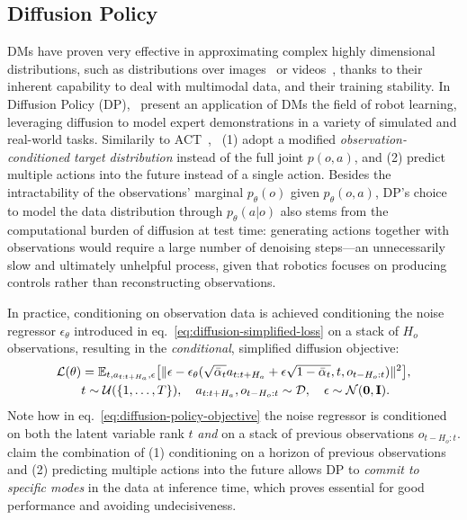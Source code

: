 \subsection{Diffusion Policy}
DMs have proven very effective in approximating complex highly dimensional distributions, such as distributions over images~\citep{hoDenoisingDiffusionProbabilistic2020} or videos~\citep{polyakMovieGenCast2025}, thanks to their inherent capability to deal with multimodal data, and their training stability.
In Diffusion Policy (DP),~\citet{chiDiffusionPolicyVisuomotor2024} present an application of DMs the field of robot learning, leveraging diffusion to model expert demonstrations in a variety of simulated and real-world tasks.
Similarily to ACT~\citep{zhaoLearningFineGrainedBimanual2023},~\citet{chiDiffusionPolicyVisuomotor2024} (1) adopt a modified \emph{observation-conditioned target distribution} instead of the full joint \( p(o,a) \), and (2) predict multiple actions into the future instead of a single action.
Besides the intractability of the observations' marginal \( p_\theta(o) \) given \(p_\theta(o,a) \), DP's choice to model the data distribution through \( p_\theta(a \vert o) \) also stems from the computational burden of diffusion at test time: generating actions together with observations would require a large number of denoising steps—an unnecessarily slow and ultimately unhelpful process, given that robotics focuses on producing controls rather than reconstructing observations.

In practice, conditioning on observation data is achieved conditioning the noise regressor \( \epsilon_\theta \) introduced in eq.~\ref{eq:diffusion-simplified-loss} on a stack of \( H_o \) observations, resulting in the \emph{conditional}, simplified diffusion objective:
\begin{align}
    \mathcal L(\theta) &= \mathbb{E}_{t, a_{t:t+H_a}, \epsilon} \big[
        \Vert \epsilon - \epsilon_\theta(\sqrt{\bar \alpha_t} a_{t:t+H_a} + \epsilon \sqrt{1 - \bar \alpha_t}, t, o_{t-H_o:t}) \Vert^2 \big], \label{eq:diffusion-policy-objective} \\
        & t \sim \mathcal{U}(\{1,\dots,T\}), \quad
        a_{t:t+H_a}, o_{t-H_o:t} \sim \mathcal{D}, \quad
        \epsilon \sim \mathcal{N}(\mathbf{0},\mathbf{I}). \notag 
\end{align}
Note how in eq.~\ref{eq:diffusion-policy-objective} the noise regressor is conditioned on both the latent variable rank \( t \) \emph{and} on a stack of previous observations \(o_{t-H_o:t} \).
\citet{chiDiffusionPolicyVisuomotor2024} claim the combination of (1) conditioning on a horizon of previous observations and (2) predicting multiple actions into the future allows DP to \emph{commit to specific modes} in the data at inference time, which proves essential for good performance and avoiding undecisiveness.

